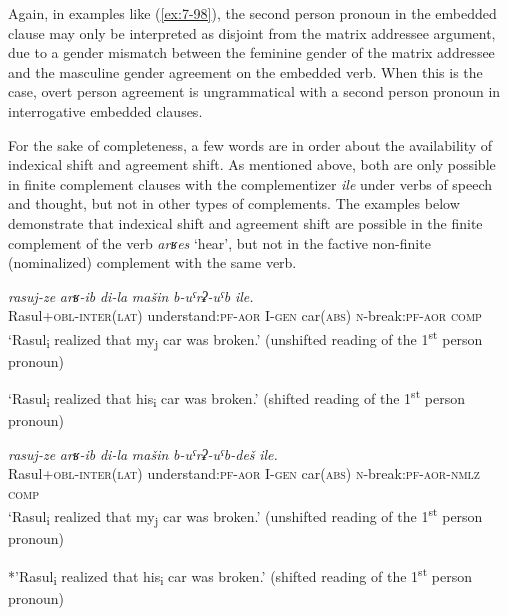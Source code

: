 ﻿\documentclass[output=paper]{langsci/langscibook}
\begin{document}
Again, in examples like (\ref{ex:7-98}), the second person pronoun in the embedded
clause may only be interpreted as disjoint from the matrix addressee
argument, due to a gender mismatch between the feminine gender of the
matrix addressee and the masculine gender agreement on the embedded
verb. When this is the case, overt person agreement is ungrammatical
with a second person pronoun in interrogative embedded clauses.

For the sake of completeness, a few words are in order about the
availability of indexical shift and agreement shift. As mentioned above, both
are only possible in finite complement clauses with the complementizer
\emph{ile} under verbs of speech and thought, but not in other types of
complements. The examples below demonstrate that indexical shift and
agreement shift are possible in the finite complement of the verb
\emph{arʁes} `hear', but not in the factive non-finite (nominalized)
complement with the same verb.

\ea %
\gll \emph{rasuj-ze} \emph{arʁ-ib} \emph{di-la} \emph{mašin} \emph{b-uˤrʡ-uˤb} \emph{ile.}\\
Rasul+\textsc{obl}-\textsc{inter(lat)} understand:\textsc{pf}-\textsc{aor} I-\textsc{gen} car(\textsc{abs}) \textsc{n}-break:\textsc{pf}-\textsc{aor} \textsc{comp}\\

\ea %
`Rasul\textsubscript{i} realized that my\textsubscript{j} car was
broken.' (unshifted reading of the 1\textsuperscript{st} person pronoun)

\ex %
`Rasul\textsubscript{i} realized that his\textsubscript{i} car was
broken.' (shifted reading of the 1\textsuperscript{st} person pronoun)
\z

\ex %
\gll \emph{rasuj-ze} \emph{arʁ-ib} \emph{di-la} \emph{mašin} \emph{b-uˤrʡ-uˤb-deš} \emph{ile.}\\
Rasul+\textsc{obl}-\textsc{inter(lat)} understand:\textsc{pf}-\textsc{aor} I-\textsc{gen} car(\textsc{abs}) \textsc{n}-break:\textsc{pf}-\textsc{aor}-\textsc{nmlz} \textsc{comp}\\

\ea %
`Rasul\textsubscript{i} realized that my\textsubscript{j} car was
broken.' (unshifted reading of the 1\textsuperscript{st} person pronoun)

\ex %
*'Rasul\textsubscript{i} realized that his\textsubscript{i} car was
broken.' (shifted reading of the 1\textsuperscript{st} person pronoun)
\pagebreak[3]
\z
\z
\end{document}
